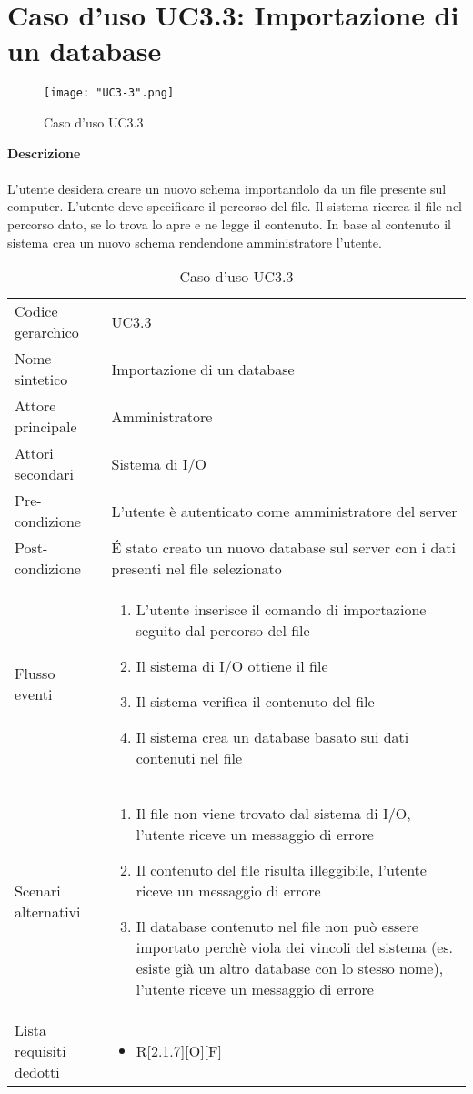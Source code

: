 \documentclass[a4paper]{report}
\begin{document}
	 \section{Caso d'uso UC3.3: Importazione di un database}
	 	\begin{figure}[H]
			\centering
			\texttt{[image: "UC3-3".png]}
			\caption{Caso d'uso UC3.3}
		\end{figure}
	 \textbf{Descrizione} \\ \\
	 L'utente desidera creare un nuovo schema importandolo da un file presente sul computer. L'utente
	  deve specificare il percorso del file. Il sistema ricerca il file nel percorso dato, se lo trova lo apre e ne 
	  legge il contenuto. In base al contenuto il sistema crea un nuovo schema rendendone amministratore
	  l'utente.
		\begin{table}[H]
		\begin{tabularx}{\textwidth}{X | X}\toprule
			\rowcolor{orange!65}Codice gerarchico & UC3.3 \\
			Nome sintetico & Importazione di un database \\
			\rowcolor{orange!65}Attore principale & Amministratore\\
			Attori secondari & Sistema di I/O \\
			\rowcolor{orange!65}Pre-condizione & L'utente è autenticato come amministratore del server\\
			Post-condizione & \'E stato creato un nuovo database sul server con i dati presenti nel file
			selezionato \\
			\rowcolor{orange!65}Flusso eventi & \begin{enumerate}
			\item L'utente inserisce il comando di importazione seguito dal percorso del file 
			\item Il sistema di I/O ottiene il file
			\item Il sistema verifica il contenuto del file
			\item Il sistema crea un database basato sui dati contenuti nel file
			\end{enumerate} \\
			Scenari alternativi & \begin{enumerate}
			\item Il file non viene trovato dal sistema di I/O, l'utente riceve un messaggio di errore
			\item Il contenuto del file risulta illeggibile, l'utente riceve un messaggio di errore
			\item Il database contenuto nel file non può essere importato perchè viola dei vincoli del sistema 
			(es. esiste già un altro database con lo stesso nome), l'utente riceve un messaggio di errore
			\end{enumerate} \\
			\rowcolor{orange!65}Lista requisiti dedotti & \begin{itemize}
			\item R[2.1.7][O][F]
			\end{itemize} \\
			\bottomrule
		\end{tabularx}
		\caption{Caso d'uso UC3.3}
	 \end{table}
\end{document}
